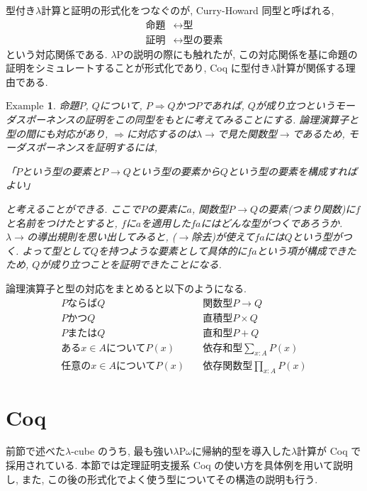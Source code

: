 \documentclass[11pt]{jsreport}
\theoremstyle{mystyle}
\newtheorem{ex}[df]{$\textrm{Example}$}
\newcommand{\bex}{\begin{ex}}
\newcommand{\eex}{\end{ex}}
\newcommand{\Lra}{\Longrightarrow}
\newcommand{\lama}{\lambda \! \! \to}
\newcommand{\0}{\textbf{0}}
\begin{document}
型付き$\lambda$計算と証明の形式化をつなぐのが, Curry-Howard 同型と呼ばれる, 
\begin{align*}
  \text{命題} &\leftrightarrow \text{型} \\
  \text{証明} &\leftrightarrow \text{型の要素}
\end{align*}
という対応関係である. $\lambda$Pの説明の際にも触れたが, この対応関係を基に命題の証明をシミュレートすることが形式化であり, Coq に型付き$\lambda$計算が関係する理由である. 
\bex 命題$P$, $Q$について, $P \Lra Q$かつ$P$であれば, $Q$が成り立つというモーダスポーネンスの証明をこの同型をもとに考えてみることにする. 論理演算子と型の間にも対応があり, $\Lra$に対応するのは$\lama$で見た関数型$\to$であるため, モーダスポーネンスを証明するには, 
\begin{center}
「$P$という型の要素と$P \to Q$という型の要素から$Q$という型の要素を構成すればよい」
\end{center}
と考えることができる. ここで$P$の要素に$a$, 関数型$P \to Q$の要素(つまり関数)に$f$と名前をつけたとすると, $f$に$a$を適用した$f a$にはどんな型がつくであろうか. $\lama$の導出規則を思い出してみると, ($\to$除去)が使えて$f a$には$Q$という型がつく. よって型として$Q$を持つような要素として具体的に$f a$という項が構成できたため, $Q$が成り立つことを証明できたことになる. 
\eex
論理演算子と型の対応をまとめると以下のようになる. 
\begin{align*}
  P \text{ならば} Q &\quad \text{関数型}P \rightarrow Q \\
  P \text{かつ} Q &\quad \text{直積型}P \times Q \\
  P \text{または} Q &\quad  \text{直和型}P + Q \\
  \text{ある} x \in A \text{について} P(x) &\quad \text{依存和型}\sum_{x : A} P (x)\\
  \text{任意の} x \in A \text{について} P(x) &\quad \text{依存関数型}\prod_{x : A} P (x)
\end{align*}
\section{Coq} \label{sec coq}
前節で述べた$\lambda$-cube のうち, 最も強い$\lambda$P$\omega$に帰納的型を導入した$\lambda$計算が Coq で採用されている. 
本節では定理証明支援系 Coq の使い方を具体例を用いて説明し, また, この後の形式化でよく使う型についてその構造の説明も行う.
\end{document}
